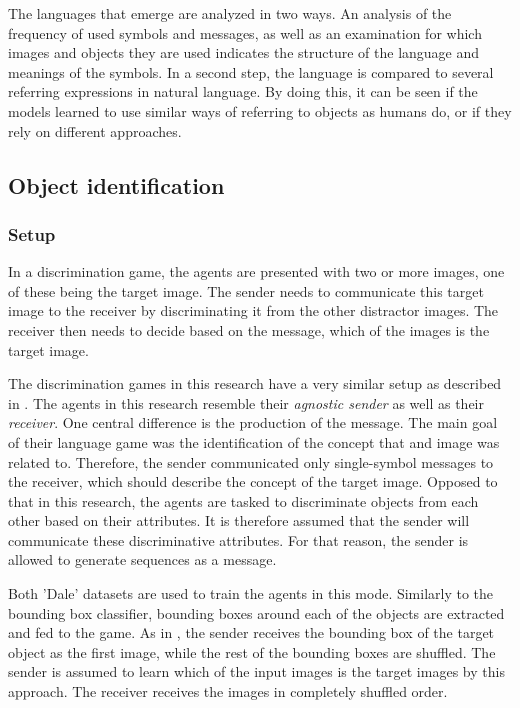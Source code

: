 The languages that emerge are analyzed in two ways.
An analysis of the frequency of used symbols and messages, as well as an examination for which images and objects they are used indicates the structure of the language and meanings of the symbols.
In a second step, the language is compared to several referring expressions in natural language.
By doing this, it can be seen if the models learned to use similar ways of referring to objects as humans do, or if they rely on different approaches.

\subsection{Object identification}
\subsubsection*{Setup}

In a discrimination game, the agents are presented with two or more images, one of these being the target image.
The sender needs to communicate this target image to the receiver by discriminating it from the other distractor images.
The receiver then needs to decide based on the message, which of the images is the target image.

The discrimination games in this research have a very similar setup as described in \citep{Lazaridou2017}.
The agents in this research resemble their \emph{agnostic sender} as well as their \emph{receiver}.
One central difference is the production of the message.
The main goal of their language game was the identification of the concept that and image was related to.
Therefore, the sender communicated only single-symbol messages to the receiver, which should describe the concept of the target image.
Opposed to that in this research, the agents are tasked to discriminate objects from each other based on their attributes.
It is therefore assumed that the sender will communicate these discriminative attributes.
For that reason, the sender is allowed to generate sequences as a message.

Both 'Dale' datasets are used to train the agents in this mode.
Similarly to the bounding box classifier, bounding boxes around each of the objects are extracted and fed to the game.
As in \citep{Lazaridou2017}, the sender receives the bounding box of the target object as the first image, while the rest of the bounding boxes are shuffled.
The sender is assumed to learn which of the input images is the target images by this approach.
The receiver receives the images in completely shuffled order.

